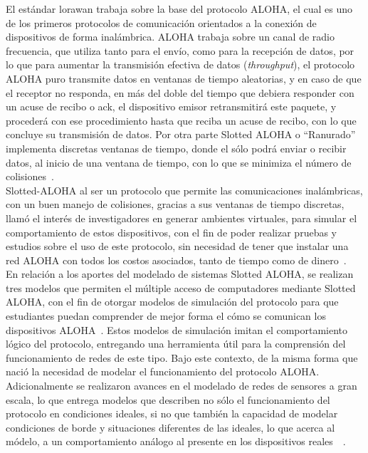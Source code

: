 \begin{justify}
El estándar \gls{lorawan} trabaja sobre la base del protocolo ALOHA, el cual es uno de los primeros protocolos de comunicación orientados a la conexión de dispositivos de forma inalámbrica. ALOHA trabaja sobre un canal de radio frecuencia, que utiliza tanto para el envío, como para la recepción de datos, por lo que para aumentar la transmisión efectiva de datos (\textit{throughput}), el protocolo ALOHA puro transmite datos en ventanas de tiempo aleatorias, y en caso de que el receptor no responda, en más del doble del tiempo que debiera responder con un acuse de recibo o \gls{ack}, el dispositivo emisor retransmitirá este paquete, y procederá con ese procedimiento hasta que reciba un acuse de recibo, con lo que concluye su transmisión de datos. Por otra parte Slotted ALOHA  o ``Ranurado'' implementa discretas ventanas de tiempo, donde el sólo podrá enviar o recibir datos, al inicio de una ventana de tiempo, con lo que se minimiza el número de colisiones~\cite{NORMAN}.\\
Slotted-ALOHA al ser un protocolo que permite las comunicaciones inalámbricas, con un buen manejo de colisiones, gracias a sus ventanas de tiempo discretas, llamó el interés de investigadores en generar ambientes virtuales, para simular el comportamiento de estos dispositivos, con el fin de poder realizar pruebas y estudios sobre el uso de este protocolo, sin necesidad de tener que instalar una red ALOHA con todos los costos asociados, tanto de tiempo como de dinero~\cite{Abdullah}.\\
En relación a los aportes del modelado de sistemas Slotted ALOHA, se realizan tres modelos que permiten el múltiple acceso de computadores mediante Slotted ALOHA, con el fin de otorgar modelos de simulación del protocolo para que estudiantes puedan comprender de mejor forma el cómo se comunican los dispositivos ALOHA~\cite{Abdullah}. Estos modelos de simulación imitan el comportamiento lógico del protocolo, entregando una herramienta útil para la comprensión del funcionamiento de redes de este tipo. Bajo este contexto, de la misma forma que nació la necesidad de modelar el funcionamiento del protocolo ALOHA. Adicionalmente se realizaron avances en el modelado de redes de sensores a gran escala, lo que entrega modelos que describen no sólo el funcionamiento del protocolo en condiciones ideales, si no que también la capacidad de modelar condiciones de borde y situaciones diferentes de las ideales, lo que acerca al módelo, a un comportamiento análogo al presente en los dispositivos reales~\cite{simulato}~\cite{simubook}.\\

\end{justify}
